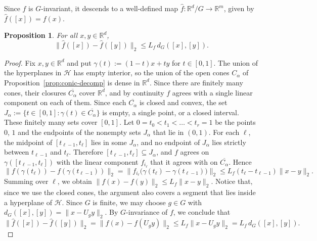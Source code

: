 \documentclass[11pt]{article}
\newcommand{\R}{\mathbb{R}}
\newtheorem{prop}[theor]{Proposition}
\theoremstyle{definition}
\begin{document}
	Since $f$ is $G$-invariant, it descends to a well-defined map
	$\widehat f:\R^d/G\to\R^m$, given by $\widehat f([x])=f(x)$. 
	\begin{prop}
		\label{prop:upper-lipschitz}
		For all $x,y\in\R^d$,
		\[
		\|\widehat f([x])-\widehat f([y])\|_2 \leq L_f\,d_G([x],[y]).
		\]
	\end{prop}

	\begin{proof}
	Fix $x,y\in\R^d$ and
		put $\gamma(t):=(1-t)x+ty$ for $t\in[0,1]$. The union of the hyperplanes in
		$\mathcal H$ has empty interior, so the union of the open cones $C_\alpha$ of
		Proposition~\ref{prop:conic-decomp} is dense in $\R^d$. Since there are finitely many
		cones, their closures $\overline{C_\alpha}$ cover $\R^d$, and by continuity $f$ agrees with a single
		linear component on each of them. Since each $\overline{C_\alpha}$ is closed and
		convex, the set $J_\alpha:=\{t\in[0,1]:\gamma(t)\in\overline{C_\alpha}\}$ is empty, a
		single point, or a closed interval. These finitely many sets
		cover $[0,1]$. Let $0=t_0<t_1<\dots<t_r=1$ be the points $0$, $1$ and the
		endpoints of the nonempty sets $J_\alpha$ that lie in $(0,1)$. For each $\ell$, the
		midpoint of $[t_{\ell-1},t_\ell]$ lies in some $J_\alpha$, and no endpoint of
		$J_\alpha$ lies strictly between $t_{\ell-1}$ and $t_\ell$. Therefore
		$[t_{\ell-1},t_\ell]\subseteq J_\alpha$, and $f$ agrees on $\gamma([t_{\ell-1},t_\ell])$ with
		the linear component $f_{i_\ell}$ that it agrees with on $\overline{C_\alpha}$. Hence
		\[
		\|f(\gamma(t_\ell))-f(\gamma(t_{\ell-1}))\|_2
		=\|f_{i_\ell}\bigl(\gamma(t_\ell)-\gamma(t_{\ell-1})\bigr)\|_2
		\le L_f(t_\ell-t_{\ell-1})\|x-y\|_2 .
		\]
		Summing over $\ell$, we obtain $\|f(x)-f(y)\|_2\le L_f\|x-y\|_2$. Notice that, since we
		use the closed cones, the argument also covers a segment that lies inside a hyperplane of
		$\mathcal H$.
		Since $G$ is finite, we may choose
		$g\in G$ with $d_G([x],[y])=\|x-U_gy\|_2$. By $G$-invariance of $f$, we conclude that
		\[
		\|\widehat f([x])-\widehat f([y])\|_2=\|f(x)-f(U_gy)\|_2\le L_f\|x-U_gy\|_2
		=L_f\,d_G([x],[y]).
		\]
	\end{proof}
\end{document}
